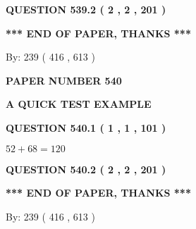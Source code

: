 \documentclass[12pt]{article}
\begin{document}
 
  
\vspace{0.2in}
  
{\textbf{\Large{QUESTION
539.2 
 ( 2 , 2 , 201 )
}}}
  
  
   
   
 \vspace{0.2in}
 
   
   
   
   
\vspace{1.0in} 
{\textbf{\large{ *** END OF PAPER, THANKS *** }}} 
   
   
\hspace{1.0in} By: 
 239 ( 416 ,  613 )
   
   
   
   
\newpage 
\setcounter{page}{ 
   540001 } 
   
   
   
   
 {\textbf{ \Large{ PAPER NUMBER  540  }}}
   
   
\vspace{0.2in}
   
   
   
   
   
   
 \vspace{0.2in}
{\LARGE {\textbf{ A QUICK TEST EXAMPLE}}}
   
   
  
\vspace{0.2in}
  
{\textbf{\Large{QUESTION
540.1 
 ( 1 , 1 , 101 )
}}}
  
  
 
 

$ %
52 +  %
68=   %
120$
 
 
  
\vspace{0.2in}
  
{\textbf{\Large{QUESTION
540.2 
 ( 2 , 2 , 201 )
}}}
  
  
   
   
 \vspace{0.2in}
 
   
   
   
   
\vspace{1.0in} 
{\textbf{\large{ *** END OF PAPER, THANKS *** }}} 
   
   
\hspace{1.0in} By: 
 239 ( 416 ,  613 )
   
\end{document}
